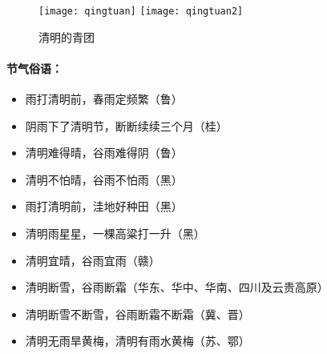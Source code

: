 \begin{figure}
\centering
\texttt{[image: qingtuan]} 
\texttt{[image: qingtuan2]}   
\caption{清明的青团}
\end{figure}

\paragraph{节气俗语：}
\begin{itemize}
\item
雨打清明前，春雨定频繁（鲁）
\item 
阴雨下了清明节，断断续续三个月（桂）
\item
清明难得晴，谷雨难得阴（鲁）
\item   
清明不怕晴，谷雨不怕雨（黑）
\item 
雨打清明前，洼地好种田（黑）
\item 
清明雨星星，一棵高粱打一升（黑）
\item 
清明宜晴，谷雨宜雨（赣）
\item 
清明断雪，谷雨断霜（华东、华中、华南、四川及云贵高原）
\item 
清明断雪不断雪，谷雨断霜不断霜（冀、晋）
\item 
清明无雨旱黄梅，清明有雨水黄梅（苏、鄂） 
\end{itemize}